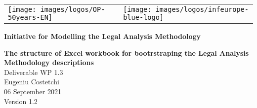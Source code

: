 
\newcommand{\DelTitle}{The structure of Excel workbook for bootrstraping the Legal Analysis Methodology descriptions}
\newcommand{\DelNumber}{WP 1.3}
\newcommand{\DelVersion}{1.2}
\newcommand{\DelAuthor}{Eugeniu Costetchi}
\newcommand{\DelDate}{06 September 2021}
\newcommand{\DelFilename}{wp1-3-excel-structure-update}


\pagestyle{empty}
\graphicspath{{figures/}}

\begin{titlepage}
\begin{center}

\begin{center}
  \begin{center}
    \setlength{\tabcolsep}{0pt}
    \begin{tabular}{>{\raggedleft}m{3.5cm}>{\centering}m{\dimexpr\textwidth - 8cm\relax}>{\raggedright}m{3.5cm}}
      \texttt{[image: images/logos/OP-50years-EN]}%
      &%
      &%
      \texttt{[image: images/logos/infeurope-blue-logo]} %
    \end{tabular}
  \end{center}


  \vspace{2mm}

  \end{center}
  \vspace{4cm}
  \textbf{{\large Initiative for Modelling the Legal Analysis Methodology\\}}
  \vspace{2cm}

  \begin{spacing}{2.5}
    \textbf{\Huge \DelTitle}\\ \vspace{2cm}
    {\large Deliverable \DelNumber} \\ %
  {\large \DelAuthor} \\ %
  {\large \DelDate} \\ %
    {\large Version \DelVersion}
  \end{spacing}

  \vspace*{\fill}


\end{center}
\end{titlepage}

